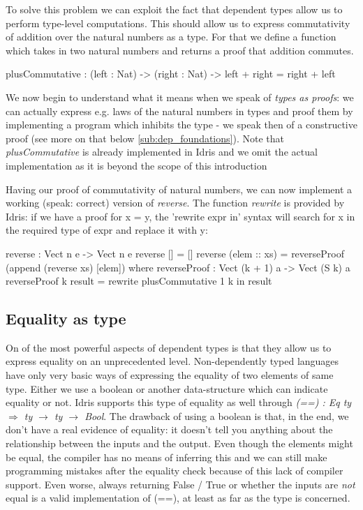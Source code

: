 To solve this problem we can exploit the fact that dependent types allow us to perform type-level computations. This should allow us to express commutativity of addition over the natural numbers as a type. For that we define a function which takes in two natural numbers and returns a proof that addition commutes. 

\begin{HaskellCode}
plusCommutative : (left : Nat) -> (right : Nat) -> left + right = right + left
\end{HaskellCode}

We now begin to understand what it means when we speak of \textit{types as proofs}: we can actually express e.g. laws of the natural numbers in types and proof them by implementing a program which inhibits the type - we speak then of a constructive proof (see more on that below \ref{sub:dep_foundations}). Note that \textit{plusCommutative} is already implemented in Idris and we omit the actual implementation as it is beyond the scope of this introduction

Having our proof of commutativity of natural numbers, we can now implement a working (speak: correct) version of \textit{reverse}. The function \textit{rewrite} is provided by Idris: if we have a proof for x = y, the 'rewrite expr in' syntax will search for x in the required type of expr and replace it with y:

\begin{HaskellCode}
reverse : Vect n e -> Vect n e
reverse [] = []
reverse (elem :: xs) = reverseProof (append (reverse xs) [elem])
  where
    reverseProof : Vect (k + 1) a -> Vect (S k) a
    reverseProof {k} result = rewrite plusCommutative 1 k in result
\end{HaskellCode}

\subsection{Equality as type}
On of the most powerful aspects of dependent types is that they allow us to express equality on an unprecedented level. Non-dependently typed languages have only very basic ways of expressing the equality of two elements of same type. Either we use a boolean or another data-structure which can indicate equality or not. Idris supports this type of equality as well through \textit{(==) : Eq ty $\Rightarrow$ ty $\rightarrow$ ty $\rightarrow$ Bool}. The drawback of using a boolean is that, in the end, we don't have a real evidence of equality: it doesn't tell you anything about the relationship between the inputs and the output. Even though the elements might be equal, the compiler has no means of inferring this and we can still make programming mistakes after the equality check because of this lack of compiler support. Even worse, always returning False / True or whether the inputs are \textit{not} equal is a valid implementation of (==), at least as far as the type is concerned.

